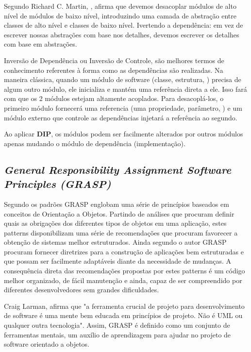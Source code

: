 \documentclass[12pt]{article}
\begin{document}
Segundo Richard C. Martin, \cite{ROBERT_MARTIN_THE_CLEAN_ARCHITECTURE}, afirma que devemos desacoplar módulos de alto nível de módulos de baixo nível, introduzindo uma camada de abstração entre classes de alto nível e classes de baixo nível. Ivertendo a dependência: em vez de escrever nossas abstrações com base nos detalhes, devemos escrever os detalhes com base em abstrações.

Inversão de Dependência ou Inversão de Controle, são melhores termos de conhecimento referentes à forma como as dependências são realizadas. Na maneira clássica, quando um módulo de software (classe, estrutura, ) precisa de algum outro módulo, ele inicializa e mantém uma referência direta a ele. Isso fará com que os 2 módulos estejam altamente acoplados. Para desacoplá-los, o primeiro módulo fornecerá uma referencia (uma propriedade, parâmetro, ) e um módulo externo que controle as dependências injetará a referência ao segundo.

Ao aplicar \textbf{DIP}, os módulos podem ser facilmente alterados por outros módulos apenas mudando o módulo de dependência (implementação).

\subsection{\textit{General Responsibility Assignment Software Principles (GRASP)}} \label{sec:grasp}

Segundo \cite{CRAIG_LARMAN} os padrões GRASP englobam uma série de princípios baseados em conceitos de Orientação a Objetos. Partindo de análises que procuram definir quais as obrigações dos diferentes tipos de objetos em uma aplicação, estes patterns disponibilizam uma série de recomendações que procuram favorecer a obtenção de sistemas melhor estruturados.
Ainda segundo o autor GRASP procuram fornecer diretrizes para a construção de aplicações bem estruturadas e que possam ser facilmente adaptáveis diante da necessidade de mudanças. A consequência direta das recomendações propostas por estes patterns é um código melhor organizado, de fácil manutenção e ainda, capaz de ser compreendido por diferentes desenvolvedores sem grandes dificuldades.

Craig Larman, afirma que "a ferramenta crucial de projeto para desenvolvimento de software é uma mente bem educada em princípios de projeto. Não é UML ou qualquer outra tecnologia". \cite{CRAIG_LARMAN} Assim, GRASP é definido como um conjunto de ferramentas mentais, um auxílio de aprendizagem para ajudar no projeto de software orientado a objetos.
\end{document}
